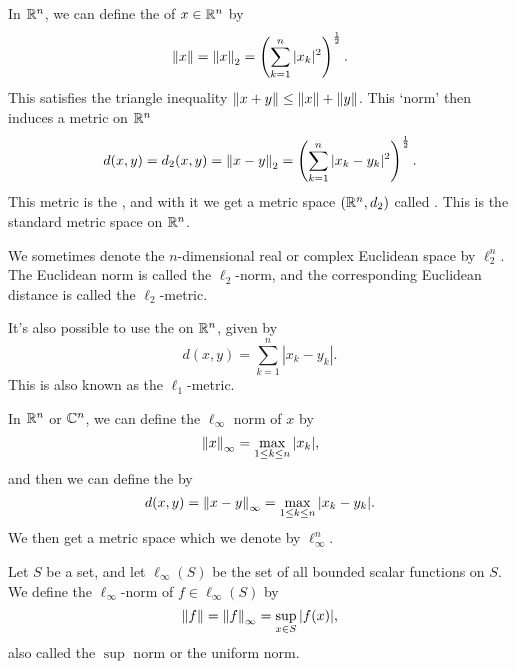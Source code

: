 \documentclass[a4paper]{scrartcl}
\begin{document}
\begin{example}
   In $\mathbb{R}^n$, we can define the 
   of $x \in \mathbb{R}^n$ by
   $$
    \norm{x} = \norm{x}_2 = \left(\sum_{k = 1}^n |x_k|^2\right)^{\frac{1}{2}}.
   $$
   This satisfies the triangle inequality $\norm{x + y} \leq \norm{x} + \norm{y}$. This `norm' then induces a metric on $\mathbb{R}^n$
   $$
    d(x, y) = d_2(x, y) = \norm{x - y}_2 = \left(\sum_{k = 1}^n |x_k - y_k|^2\right)^{\frac{1}{2}}.
   $$
   This metric is the , and with it we get a metric space $(\mathbb{R}^n, d_2)$ called . This is the standard metric space on $\mathbb{R}^n$.
\end{example}
\begin{remark}
    We sometimes denote the $n$-dimensional real or complex Euclidean space by $\ell_2^n$. The Euclidean norm is called the $\ell_2$-norm, and the corresponding Euclidean distance is called the $\ell_2$-metric.
\end{remark}

\begin{example}
It's also possible to use the  on $\mathbb{R}^n$, given by
$$
d(x, y) = \sum_{k = 1}^{n} |x_k - y_k|.
$$
This is also known as the $\ell_1$-metric.
\end{example}

\begin{example}
In $\mathbb{R}^n$ or $\mathbb{C}^n$, we can define the $\ell_{\infty}$ norm of $x$ by
$$
    \norm{x}_{\infty} = \max_{1 \leq k \leq n} |x_k|,
$$
and then we can define the  by
$$
d(x, y) = \norm{x - y}_{\infty} = \max_{1 \leq k \leq n} |x_k - y_k|.
$$
We then get a metric space which we denote by $\ell_{\infty}^n$.
\end{example}

\begin{example}
    Let $S$ be a set, and let $\ell_{\infty}(S)$ be the set of all bounded scalar functions on $S$. We define the $\ell_{\infty}$-norm of $f \in \ell_{\infty}(S)$ by
    $$
    \norm{f} = \norm{f}_{\infty} = \sup_{x \in S}|f(x)|,
    $$
    also called the $\sup$ norm or the uniform norm.
\end{example}
\end{document}
